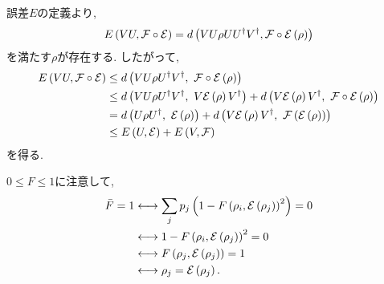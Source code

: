 \begin{ex}
    \label{ex9.22}
    誤差$E$の定義より, 
    \begin{align*}
        E\left( VU, \mathcal{F} \circ \mathcal{E}\right) 
        = d \left( VU \rho U U^\dagger V^\dagger, \mathcal{F} \circ \mathcal{E} \left( \rho \right)\right)
    \end{align*}
    を満たす$\rho$が存在する. したがって, 
    \begin{align*}
        E\left( VU, \mathcal{F} \circ \mathcal{E}\right) 
        &\le
        d \left( VU \rho U^\dagger V^\dagger,\  \mathcal{F} \circ \mathcal{E} \left( \rho \right)\right)
        \\
        &\le 
        d \left( VU \rho U^\dagger V^\dagger,\  V \mathcal{E}\left(\rho\right) V^\dagger \right)
        +
        d \left(V \mathcal{E}\left(\rho\right) V^\dagger,\  \mathcal{F} \circ \mathcal{E} \left(\rho\right) \right)
        \\
        &=
        d \left( U \rho U^\dagger,\ \mathcal{E}\left(\rho\right) \right)
        +
        d \left(V \mathcal{E}\left(\rho\right) V^\dagger,\  \mathcal{F} \left(\mathcal{E} \left(\rho\right)\right) \right)
        \\
        &\le
        E\left(U, \mathcal{E}\right) + E\left(V, \mathcal{F}\right)
    \end{align*}
    を得る.
\end{ex}

\begin{ex}
    $0 \leq F \leq 1 $に注意して,
    \begin{align*}
        \bar{F} = 1 
        &\longleftrightarrow
        \sum_j p_j \left( 1 - F \left( \rho_i, \mathcal{E}\left( \rho_j\right)\right)^2\right) = 0\\
        &\longleftrightarrow
        1 - F \left( \rho_i, \mathcal{E}\left( \rho_j\right)\right)^2 = 0 \\
        &\longleftrightarrow
        F \left( \rho_j, \mathcal{E} \left( \rho_j \right)\right) = 1 \\
        &\longleftrightarrow
        \rho_j =  \mathcal{E} \left( \rho_j \right).
    \end{align*} 
\end{ex}
